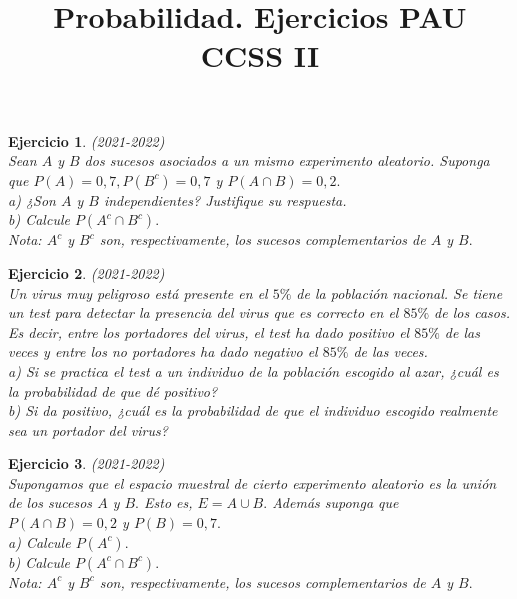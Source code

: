 \documentclass[12pt, a4paper]{amsart}
\newtheorem{ejer}{Ejercicio}
\begin{document}
\thispagestyle{plain}

\title{Probabilidad. Ejercicios PAU CCSS II}

\date{}

\maketitle

\begin{ejer}\em (2021-2022)\\
Sean $A$ y $B$ dos sucesos asociados a un mismo experimento aleatorio. Suponga que $P (A) = 0,7 , P (B^c ) = 0,7$ y $P (A \cap B) = 0,2 .$\\
a) ¿Son $A$ y $B$ independientes? Justifique su respuesta.\\
b) Calcule $P(A^c \cap B^c).$\\
Nota: $A^c$ y $B^c$ son, respectivamente, los sucesos complementarios de $A$ y $B.$
\end{ejer}

\begin{ejer}\em (2021-2022)\\
Un virus muy peligroso está presente en el $5\%$ de la población nacional. Se tiene un test para detectar la presencia del virus que es correcto en el $85\%$ de los casos. Es decir, entre los portadores del virus, el test ha dado positivo el $85\%$ de las veces y entre los no portadores ha dado negativo el $85\%$ de las veces.\\
a) Si se practica el test a un individuo de la población escogido al azar, ¿cuál es la probabilidad de que dé positivo?\\
b) Si da positivo, ¿cuál es la probabilidad de que el individuo escogido realmente sea un portador del virus?
\end{ejer}

\begin{ejer}\em (2021-2022)\\
Supongamos que el espacio muestral de cierto experimento aleatorio es la unión de los sucesos $A$ y $B.$ Esto es, $E = A \cup B.$ Además suponga que $P (A \cap B) = 0,2$ y $P (B) = 0,7.$\\
a) Calcule $P(A^c).$\\
b) Calcule $P(A^c \cap B^c).$\\
Nota: $A^c$ y $B^c$ son, respectivamente, los sucesos complementarios de $A$ y $B.$
\end{ejer}
\end{document}
